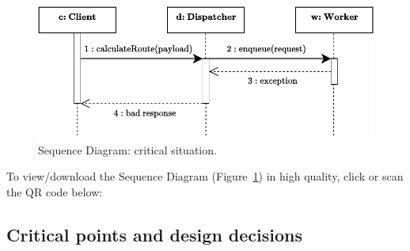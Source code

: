 \documentclass[a4paper]{article}
\begin{document}
    \begin{figure}[!htp]
        \centering
        \includegraphics[width=\textwidth]{img/sequence-diagram-4.pdf}
        \caption{Sequence Diagram: critical situation.}
        \label{fig: Sequence Diagram: critical situation}
    \end{figure}

    \noindent
    To view/download the Sequence Diagram (Figure~\ref{fig: Sequence Diagram: critical situation}) in high quality, click or scan the QR code below:
    \begin{center}
    \end{center}


    \newpage

    \subsection{Critical points and design decisions}\label{subsection: Critical points and design decisions}
\end{document}
